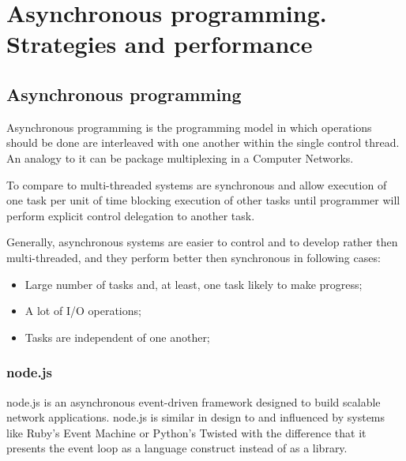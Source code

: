 \chapter{Asynchronous programming. Strategies and performance}
 \label{chap:async}
\section{Asynchronous programming}
\label{sec:async}
Asynchronous programming is the programming model in which operations should be done are interleaved with one another within the single control thread. An analogy to it can be package multiplexing in a Computer Networks. 

To compare to multi-threaded systems are synchronous and allow execution of one task per unit of time blocking execution of other tasks until programmer will perform explicit control delegation to another task.

Generally, asynchronous systems are easier to control and to develop rather then multi-threaded, and  they perform better then synchronous in following cases\cite{asyncArticle}:
 \begin{itemize}
	\item Large number of tasks and, at least, one task likely to make progress;
	\item A lot of I/O operations;
	\item Tasks are independent of one another;
 \end{itemize}



\subsection{node.js}
\label{subsec:node}
node.js is an asynchronous event-driven framework designed to build scalable network applications.
node.js is similar in design to and influenced by systems like Ruby's Event Machine or Python's Twisted with the difference that it presents the event loop as a language construct instead of as a library\cite{nodejsabout}.


